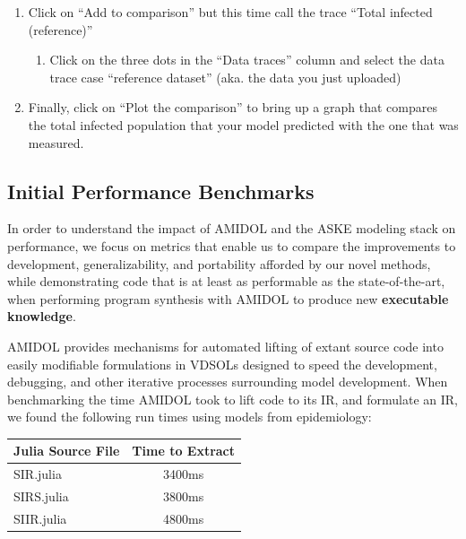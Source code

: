 \documentclass[12pt]{galois-whitepaper}
\begin{document}
\begin{enumerate}
  the total infected population.
  \begin{enumerate}
    \item Download the SIIR\textunderscore infection\textunderscore
      rates\textunderscore demo.json data file (\url{https://raw.githubusercontent.com/GaloisInc/AMIDOL/master/examples/reference-data/SIIR_infection_rates_demo.json}).      
  \item In the “Upload new data trace” section, enter “reference
    dataset”, browse and select the file you just downloaded, and
    click “Upload trace”
  \end{enumerate}
\item Click on “Add to comparison” but this time call the trace “Total
  infected (reference)”
  \begin{enumerate}
  \item Click on the three dots in the “Data traces” column and select
    the data trace case “reference dataset” (aka. the data you just
    uploaded)
  \end{enumerate}
\item Finally, click on “Plot the comparison” to bring up a graph that compares the total infected population that your model predicted with the one that was measured.
\end{enumerate}

\subsection{Initial Performance Benchmarks}

In order to understand the impact of AMIDOL and the ASKE modeling
stack on performance, we focus on metrics that enable us to compare
the improvements to development, generalizability, and portability
afforded by our novel methods, while demonstrating code that is at
least as performable as the state-of-the-art, when performing program
synthesis with AMIDOL to produce new \textbf{executable knowledge}.

AMIDOL provides mechanisms for automated lifting of extant source code
into easily modifiable formulations in VDSOLs designed to speed the
development, debugging, and other iterative processes surrounding
model development.  When benchmarking the time AMIDOL took to lift
code to its IR, and formulate an IR, we found the following run times
using models from epidemiology:

\begin{center}
\begin{tabular}{|l|c|}
  \hline
  \textbf{Julia Source File} & \textbf{Time to Extract}\\
  \hline
  SIR.julia & 3400ms\\
  \hline
  SIRS.julia & 3800ms\\
  \hline
  SIIR.julia & 4800ms\\
  \hline
\end{tabular}
\end{center}
\end{document}
